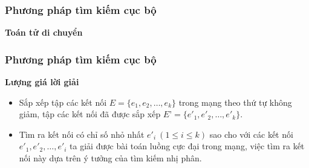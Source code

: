 \begin{frame}
    \frametitle{Phương pháp tìm kiếm cục bộ}

    \textbf{Toán tử di chuyển}

    \begin{figure}[h!]
        \centering
        \hspace{1cm}
    \end{figure}
\end{frame}

\begin{frame}
    \frametitle{Phương pháp tìm kiếm cục bộ}

    \textbf{Lượng giá lời giải}

    \begin{itemize}
        \item Sắp xếp tập các kết nối $E = \{e_1, e_2,…, e_k\}$ trong mạng theo thứ tự không giảm, tập các kết nối đã được sắp xếp $E’ = \{e'_1, e'_2,…, e'_k\}$.
        \item Tìm ra kết nối có chỉ  số nhỏ nhất $e'_i ~(1 \leq i \leq k)$ sao cho với các kết nối $e'_1, e'_2, …, e'_i$ ta giải được bài toán luồng cực đại trong mạng, việc tìm ra kết nối này dựa trên ý tưởng của tìm kiếm nhị phân.
    \end{itemize}
\end{frame}


